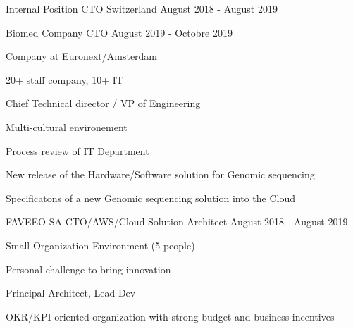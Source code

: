 \begin{cventries}
        \cventry
        {Internal Position} %
        {CTO} %
        {Switzerland} %
        {August 2018 - August 2019} %
        {}
        \cventry
        {} %
        {} %
        {} %
        {} %
        {
            \globalexperience
            {Biomed Company} %
            {CTO} %
            {August 2019 - Octobre 2019} %
            {
                \begin{cvitems} %
                    \item{Company at Euronext/Amsterdam}
                    \item{20+ staff company, 10+ IT}
                    \item{Chief Technical director / VP of Engineering}
                    \item{Multi-cultural environement}
                \end{cvitems}
            }
            {
                \begin{cvitems} %
                    \item{Process review of IT Department}
                    \item{New release of the Hardware/Software solution for Genomic sequencing}
                    \item{Specificatons of a new Genomic sequencing solution into the Cloud}
                \end{cvitems}
            }
            {
                \begin{cvitems} %
                \end{cvitems}
            }
        }
        \cventry
        {} %
        {} %
        {} %
        {} %
        {
            \globalexperience
            {FAVEEO SA} %
            {CTO/AWS/Cloud Solution Architect} %
            {August 2018 - August 2019} %
            {
                \begin{cvitems} %
                    \item{Small Organization Environment (5 people)}
                    \item{Personal challenge to bring innovation}
                    \item{Principal Architect, Lead Dev}
                    \item{OKR/KPI oriented organization with strong budget and business incentives }

\end{cvitems}}}
\end{cventries}
